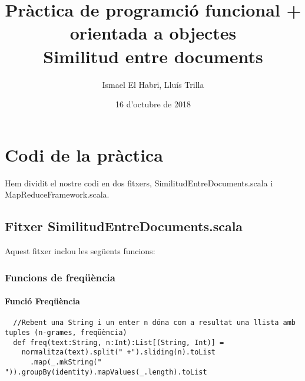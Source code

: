 \documentclass[11pt,a4paper,twoside]{report}
\begin{document}
\title{Pràctica de programció funcional + orientada a objectes\\
\large Similitud entre documents}
\author{Ismael El Habri, Lluís Trilla}
\date{16 d'octubre de 2018}
\maketitle

\tableofcontents

\chapter{Codi de la pràctica}

Hem dividit el nostre codi en dos fitxers, SimilitudEntreDocuments.scala i MapReduceFramework.scala.

\section{Fitxer SimilitudEntreDocuments.scala}

Aquest fitxer inclou les següents funcions:
\subsection{Funcions de freqüència}

\subsubsection*{Funció Freqüència}
\begin{lstlisting}
  //Rebent una String i un enter n dóna com a resultat una llista amb tuples (n-grames, freqüència)
  def freq(text:String, n:Int):List[(String, Int)] =
    normalitza(text).split(" +").sliding(n).toList
      .map(_.mkString(" ")).groupBy(identity).mapValues(_.length).toList
\end{lstlisting}
\end{document}
